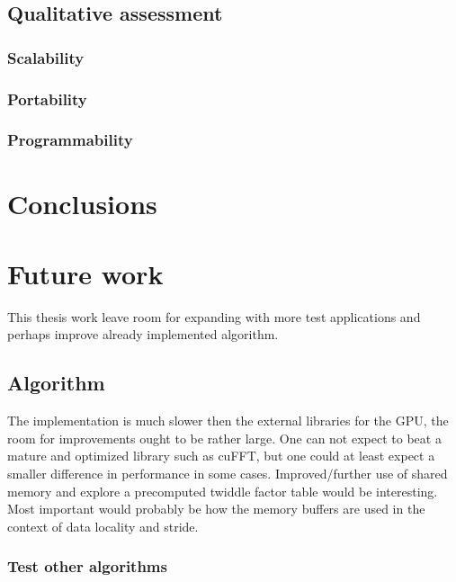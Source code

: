 \subsection{Qualitative assessment}

\subsubsection{Scalability}

\subsubsection{Portability}

\subsubsection{Programmability}

\section{Conclusions}


\section{Future work}

This thesis work leave room for expanding with more test applications and perhaps improve already implemented algorithm.

\subsection{Algorithm}

The implementation is much slower then the external libraries for the GPU, the room for improvements ought to be rather large. One can not expect to beat a mature and optimized library such as cuFFT, but one could at least expect a smaller difference in performance in some cases. Improved/further use of shared memory and explore a precomputed twiddle factor table would be interesting. Most important would probably be how the memory buffers are used in the context of data locality and stride.

\subsubsection{Test other algorithms}

